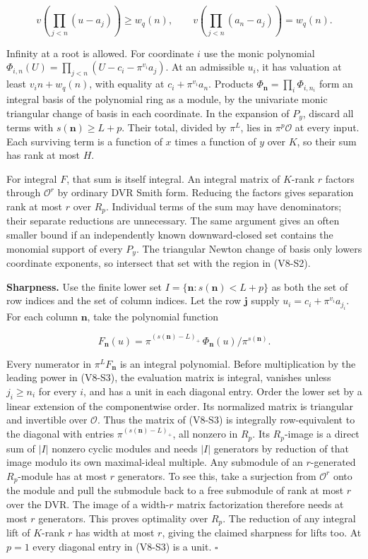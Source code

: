 \documentclass[
  11pt,
]{article}
\begin{document}
\[
 v\!\left(\prod_{j<n}(u-a_j)\right)\ge w_q(n),\qquad
 v\!\left(\prod_{j<n}(a_n-a_j)\right)=w_q(n).
\]

Infinity at a root is allowed. For coordinate \(i\) use the monic
polynomial \(\Phi_{i,n}(U)=\prod_{j<n}(U-c_i-\pi^{v_i}a_j)\). At an
admissible \(u_i\), it has valuation at least \(v_i n+w_q(n)\), with
equality at \(c_i+\pi^{v_i}a_n\). Products
\(\Phi_{\boldsymbol n}=\prod_i\Phi_{i,n_i}\) form an integral basis of
the polynomial ring as a module, by the univariate monic triangular
change of basis in each coordinate. In the expansion of \(P_y\), discard
all terms with \(s(\boldsymbol n)\ge L+p\). Their total, divided by
\(\pi^L\), lies in \(\pi^p\mathcal O\) at every input. Each surviving
term is a function of \(x\) times a function of \(y\) over \(K\), so
their sum has rank at most \(H\).

For integral \(F\), that sum is itself integral. An integral matrix of
\(K\)-rank \(r\) factors through \(\mathcal O^r\) by ordinary DVR Smith
form. Reducing the factors gives separation rank at most \(r\) over
\(R_p\). Individual terms of the sum may have denominators; their
separate reductions are unnecessary. The same argument gives an often
smaller bound if an independently known downward-closed set contains the
monomial support of every \(P_y\). The triangular Newton change of basis
only lowers coordinate exponents, so intersect that set with the region
in (V8-S2).

\textbf{Sharpness.} Use the finite lower set
\(I=\{\boldsymbol n:s(\boldsymbol n)<L+p\}\) as both the set of row
indices and the set of column indices. Let the row \(\boldsymbol j\)
supply \(u_i=c_i+\pi^{v_i}a_{j_i}\). For each column \(\boldsymbol n\),
take the polynomial function

\[
 F_{\boldsymbol n}(u)
 =\pi^{(s(\boldsymbol n)-L)_+}\,
                \Phi_{\boldsymbol n}(u)/\pi^{s(\boldsymbol n)}.
                                                                    \tag{V8-S3}
\]

Every numerator in \(\pi^L F_{\boldsymbol n}\) is an integral
polynomial. Before multiplication by the leading power in (V8-S3), the
evaluation matrix is integral, vanishes unless \(j_i\ge n_i\) for every
\(i\), and has a unit in each diagonal entry. Order the lower set by a
linear extension of the componentwise order. Its normalized matrix is
triangular and invertible over \(\mathcal O\). Thus the matrix of (V8-S3)
is integrally row-equivalent to the diagonal with entries
\(\pi^{(s(\boldsymbol n)-L)_+}\), all nonzero in \(R_p\). Its
\(R_p\)-image is a direct sum of \(|I|\) nonzero cyclic modules and
needs \(|I|\) generators by reduction of that image modulo its own
maximal-ideal multiple. Any submodule of an \(r\)-generated
\(R_p\)-module has at most \(r\) generators. To see this, take a
surjection from \(\mathcal O^r\) onto the module and pull the submodule
back to a free submodule of rank at most \(r\) over the DVR. The image
of a width-\(r\) matrix factorization therefore needs at most \(r\)
generators. This proves optimality over \(R_p\). The reduction of any
integral lift of \(K\)-rank \(r\) has width at most \(r\), giving the
claimed sharpness for lifts too. At \(p=1\) every diagonal entry in (V8-S3)
is a unit. \(\square\)
\end{document}
